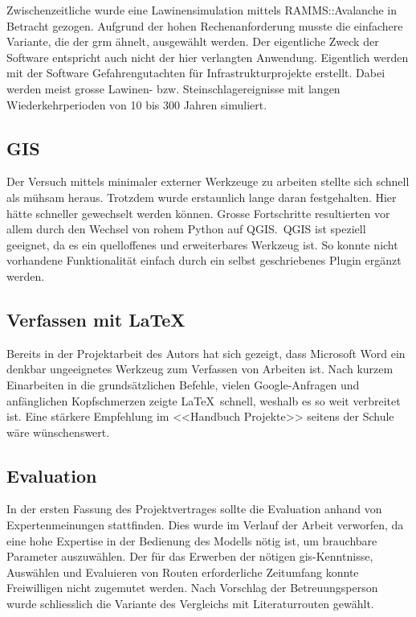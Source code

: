 Zwischenzeitliche wurde eine Lawinensimulation mittels RAMMS::Avalanche in Betracht gezogen. Aufgrund der hohen Rechenanforderung musste die einfachere Variante, die der \gls{grm} ähnelt, ausgewählt werden. Der eigentliche Zweck der Software entspricht auch nicht der hier verlangten Anwendung. Eigentlich werden mit der Software Gefahrengutachten für Infrastrukturprojekte erstellt. Dabei werden meist grosse Lawinen- bzw. Steinschlagereignisse mit langen Wiederkehrperioden von 10 bis 300 Jahren simuliert.





\subsection{GIS}

Der Versuch mittels minimaler externer Werkzeuge zu arbeiten stellte sich schnell als mühsam heraus. Trotzdem wurde erstaunlich lange daran festgehalten. Hier hätte schneller gewechselt werden können. 
Grosse Fortschritte resultierten vor allem durch den Wechsel von rohem Python auf QGIS.\ QGIS ist speziell geeignet, da es ein quelloffenes und erweiterbares Werkzeug ist. So konnte nicht vorhandene Funktionalität einfach durch ein selbst geschriebenes Plugin ergänzt werden.
\pagebreak
\subsection{Verfassen mit LaTeX}
Bereits in der Projektarbeit des Autors hat sich gezeigt, dass Microsoft Word ein denkbar ungeeignetes Werkzeug zum Verfassen von Arbeiten ist. Nach kurzem Einarbeiten in die grundsätzlichen Befehle, vielen Google-Anfragen und anfänglichen Kopfschmerzen zeigte \LaTeX\ schnell, weshalb es so weit verbreitet ist. Eine stärkere Empfehlung im <<Handbuch Projekte>> seitens der Schule wäre wünschenswert.

\subsection{Evaluation}

In der ersten Fassung des Projektvertrages sollte die Evaluation anhand von Expertenmeinungen stattfinden. Dies wurde im  Verlauf der Arbeit verworfen, da eine hohe Expertise in der Bedienung des Modells nötig ist, um brauchbare Parameter auszuwählen. Der für das Erwerben der nötigen \gls{gis}-Kenntnisse, Auswählen und Evaluieren von Routen erforderliche Zeitumfang konnte Freiwilligen nicht zugemutet werden. Nach Vorschlag der Betreuungsperson wurde schliesslich die Variante des Vergleichs mit Literaturrouten gewählt.

